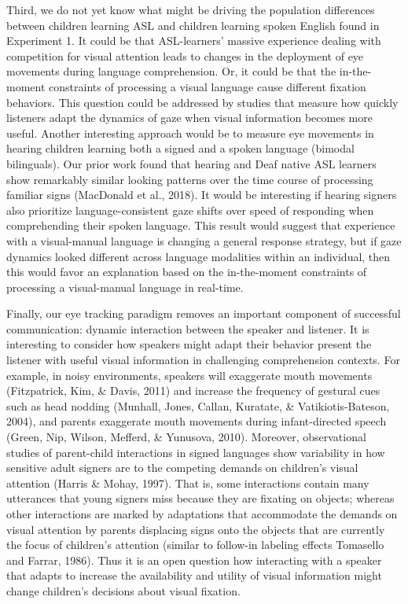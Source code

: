 \documentclass[,man,floatsintext]{apa6}
\begin{document}
Third, we do not yet know what might be driving the population
differences between children learning ASL and children learning spoken
English found in Experiment 1. It could be that ASL-learners' massive
experience dealing with competition for visual attention leads to
changes in the deployment of eye movements during language
comprehension. Or, it could be that the in-the-moment constraints of
processing a visual language cause different fixation behaviors. This
question could be addressed by studies that measure how quickly
listeners adapt the dynamics of gaze when visual information becomes
more useful. Another interesting approach would be to measure eye
movements in hearing children learning both a signed and a spoken
language (bimodal bilinguals). Our prior work found that hearing and
Deaf native ASL learners show remarkably similar looking patterns over
the time course of processing familiar signs (MacDonald et al., 2018).
It would be interesting if hearing signers also prioritize
language-consistent gaze shifts over speed of responding when
comprehending their spoken language. This result would suggest that
experience with a visual-manual language is changing a general response
strategy, but if gaze dynamics looked different across language
modalities within an individual, then this would favor an explanation
based on the in-the-moment constraints of processing a visual-manual
language in real-time.

Finally, our eye tracking paradigm removes an important component of
successful communication: dynamic interaction between the speaker and
listener. It is interesting to consider how speakers might adapt their
behavior present the listener with useful visual information in
challenging comprehension contexts. For example, in noisy environments,
speakers will exaggerate mouth movements (Fitzpatrick, Kim, \& Davis,
2011) and increase the frequency of gestural cues such as head nodding
(Munhall, Jones, Callan, Kuratate, \& Vatikiotis-Bateson, 2004), and
parents exaggerate mouth movements during infant-directed speech (Green,
Nip, Wilson, Mefferd, \& Yunusova, 2010). Moreover, observational
studies of parent-child interactions in signed languages show
variability in how sensitive adult signers are to the competing demands
on children's visual attention (Harris \& Mohay, 1997). That is, some
interactions contain many utterances that young signers miss because
they are fixating on objects; whereas other interactions are marked by
adaptations that accommodate the demands on visual attention by parents
displacing signs onto the objects that are currently the focus of
children's attention (similar to follow-in labeling effects Tomasello
and Farrar, 1986). Thus it is an open question how interacting with a
speaker that adapts to increase the availability and utility of visual
information might change children's decisions about visual fixation.
\end{document}
